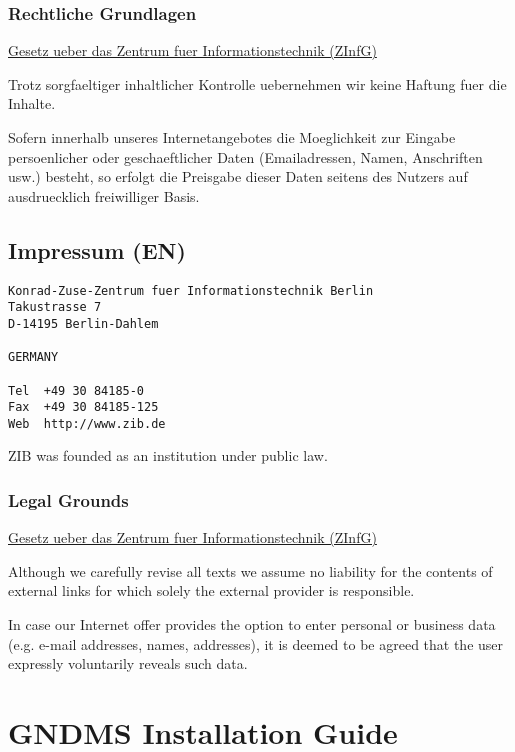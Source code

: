 \documentclass{article}
\begin{document}
\subsubsection{Rechtliche Grundlagen}

\href{http://www.zib.de/General/Organization/gesetz/index.en.html}{Gesetz ueber das Zentrum fuer Informationstechnik (ZInfG)}

Trotz sorgfaeltiger inhaltlicher Kontrolle uebernehmen wir keine
Haftung fuer die Inhalte.

Sofern innerhalb unseres Internetangebotes die Moeglichkeit zur
Eingabe persoenlicher oder geschaeftlicher Daten (Emailadressen,
Namen, Anschriften usw.) besteht, so erfolgt die Preisgabe dieser
Daten seitens des Nutzers auf ausdruecklich freiwilliger Basis.

\subsection{Impressum (EN)}

\begin{verbatim}
Konrad-Zuse-Zentrum fuer Informationstechnik Berlin
Takustrasse 7
D-14195 Berlin-Dahlem

GERMANY

Tel  +49 30 84185-0
Fax  +49 30 84185-125
Web  http://www.zib.de
\end{verbatim}

ZIB was founded as an institution under public law.

\subsubsection{Legal Grounds}

\href{http://www.zib.de/General/Organization/gesetz/index.en.html}{Gesetz ueber das Zentrum fuer Informationstechnik (ZInfG)}

Although we carefully revise all texts we assume no liability for
the contents of external links for which solely the external
provider is responsible.

In case our Internet offer provides the option to enter personal or
business data (e.g. e-mail addresses, names, addresses), it is
deemed to be agreed that the user expressly voluntarily reveals
such data.

\section{GNDMS Installation Guide}
\end{document}
